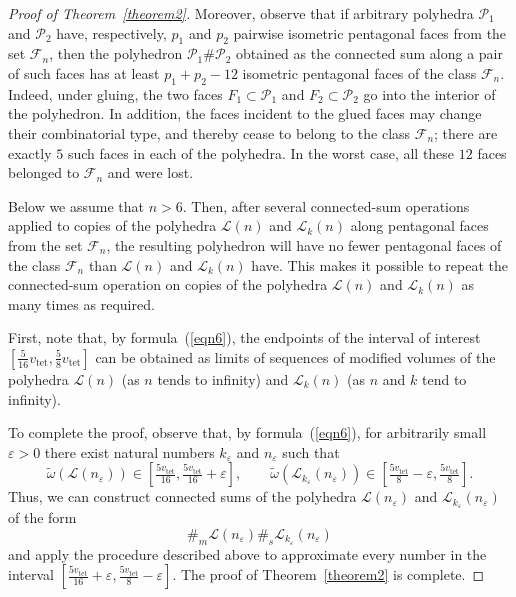 \documentclass{amsart}
\newcommand{\tomega}{\widetilde{\omega}}
\newcommand{\vtet}{v_{\mathrm{tet}}}
\begin{document}
\begin{proof}[Proof of Theorem~\ref{theorem2}]
		Moreover, observe that if arbitrary polyhedra $\mathcal P_1$ and $\mathcal P_2$ have, respectively, $p_1$ and $p_2$ pairwise isometric pentagonal faces from the set $\mathcal{F}_n$, then the polyhedron $\mathcal P_1 \# \mathcal P_2$ obtained as the connected sum along a pair of such faces has at least $p_1 + p_2 - 12$ isometric pentagonal faces of the class $\mathcal{F}_n$. Indeed, under gluing, the two faces $F_1 \subset \mathcal P_1$ and $F_2 \subset \mathcal P_2$ go into the interior of the polyhedron. In addition, the faces incident to the glued faces may change their combinatorial type, and thereby cease to belong to the class $\mathcal{F}_n$; there are exactly $5$ such faces in each of the polyhedra. In the worst case, all these $12$ faces belonged to $\mathcal{F}_n$ and were lost.

		Below we assume that $n>6$. Then, after several connected-sum operations applied to copies of the polyhedra $\mathcal L(n)$ and $\mathcal L_k(n)$ along pentagonal faces from the set $\mathcal{F}_n$, the resulting polyhedron will have no fewer pentagonal faces of the class $\mathcal{F}_n$ than $\mathcal L(n)$ and $\mathcal L_k(n)$ have.
		This makes it possible to repeat the connected-sum operation on copies of the polyhedra $\mathcal L(n)$ and $\mathcal L_k(n)$ as many times as required.

		First, note that, by formula~(\ref{eqn6}), the endpoints of the interval of interest $\left[\frac{5}{16} \vtet, \frac{5}{8} \vtet \right]$ can be obtained as limits of sequences of modified volumes of the polyhedra $\mathcal L(n)$ (as $n$ tends to infinity) and $\mathcal L_k(n)$ (as $n$ and $k$ tend to infinity).
	
		To complete the proof, observe that, by formula~(\ref{eqn6}), for arbitrarily small $\varepsilon > 0$ there exist natural numbers $k_{\varepsilon}$ and $n_{\varepsilon}$ such that
	$$
	\tomega(\mathcal L(n_{\varepsilon}))  \in [\tfrac{5\vtet}{16}, \tfrac{5\vtet}{16} + \varepsilon], \qquad
	\tomega(\mathcal L_{k_{\varepsilon}}(n_{\varepsilon}))  \in [\tfrac{5\vtet}{8} - \varepsilon, \tfrac{5\vtet}{8}].
	$$ 
		Thus, we can construct connected sums of the polyhedra $\mathcal L(n_{\varepsilon})$ and $\mathcal L_{k_{\varepsilon}}(n_{\varepsilon})$ of the form
	$$
	\#_m \mathcal L(n_{\varepsilon}) \#_s \mathcal L_{k_{\varepsilon}}(n_{\varepsilon})
	$$
		and apply the procedure described above to approximate every number in the interval $[\tfrac{5\vtet}{16} + \varepsilon, \tfrac{5\vtet}{8} - \varepsilon]$.
	The proof of Theorem~\ref{theorem2} is complete. 
\end{proof}
		
\end{document}
